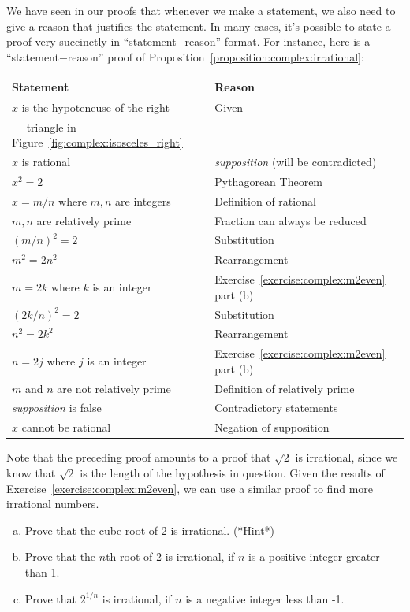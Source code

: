 We have seen in our proofs that whenever we make a statement, we also need to give a reason that justifies the statement. In many cases, it's possible to state a proof very succinctly in  ``statement$-$reason'' format. For instance, here is a ``statement$-$reason'' proof of Proposition~\ref{proposition:complex:irrational}:

\begin{tabular}{l| l}
Statement& Reason\\
\hline
$x$ is the hypoteneuse of the right & Given\\
~~ triangle in Figure~\ref{fig:complex:isosceles_right} & ~\\
$x$ is rational & \emph{supposition} (will be contradicted)\\
$x^2 = 2$ & Pythagorean Theorem\\
$x = m/n$ where $m,n$ are integers& Definition of rational\\
$m, n$ are relatively prime & Fraction can always be reduced\\
$(m/n)^2 = 2$ & Substitution\\
$m^2 = 2n^2$ & Rearrangement\\
$m = 2k$ where $k$ is an integer & Exercise~\ref{exercise:complex:m2even} part (b)\\
$(2k/n)^2 = 2$ & Substitution\\
$n^2 = 2k^2$& Rearrangement\\
$n = 2j$ where  $j$ is an integer&Exercise~\ref{exercise:complex:m2even} part (b)\\
$m$ and $n$ are not relatively prime& Definition of relatively prime\\
\emph{supposition} is false & Contradictory statements\\
$x$ cannot be rational &  Negation of supposition
\end{tabular}

Note that the preceding proof amounts to a proof that $\sqrt{2}$ is irrational, since we know that $\sqrt{2}$ is the length of the hypothesis in question. Given the results of Exercise~\ref{exercise:complex:m2even}, we can use a similar proof to find more irrational numbers.

\begin{exercise}\label{exercise:complex:6}
\begin{enumerate}[(a)]
\item
Prove that the cube root of 2 is irrational.
\hyperref[sec:complex:hints]{(*Hint*)} 
\item
Prove that the $n$th root of 2 is irrational, if $n$ is a positive integer greater than 1.
\item
Prove that $2^{1/n}$ is irrational, if $n$ is a negative integer less than -1.
\end{enumerate}
\end{exercise}

